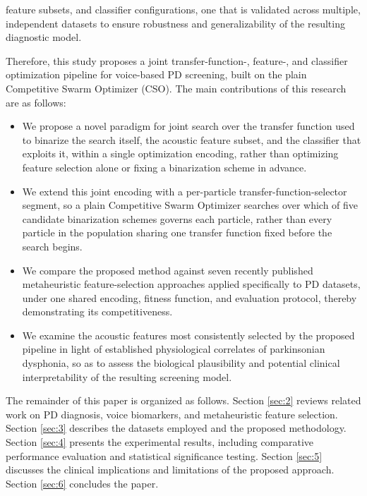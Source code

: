 feature subsets, and classifier configurations, one that is validated across multiple, independent datasets to ensure robustness and generalizability of the resulting diagnostic model.

Therefore, this study proposes a joint transfer-function-, feature-, and classifier optimization pipeline for voice-based PD screening, built on the plain Competitive Swarm Optimizer (CSO). The main contributions of this research are as follows:

\begin{itemize}
    \item We propose a novel paradigm for joint search over the transfer function used to binarize the search itself, the acoustic feature subset, and the classifier that exploits it, within a single optimization encoding, rather than optimizing feature selection alone or fixing a binarization scheme in advance.
    \item We extend this joint encoding with a per-particle transfer-function-selector segment, so a plain Competitive Swarm Optimizer searches over which of five candidate binarization schemes governs each particle, rather than every particle in the population sharing one transfer function fixed before the search begins.
    \item We compare the proposed method against seven recently published metaheuristic feature-selection approaches applied specifically to PD datasets, under one shared encoding, fitness function, and evaluation protocol, thereby demonstrating its competitiveness.
    \item We examine the acoustic features most consistently selected by the proposed pipeline in light of established physiological correlates of parkinsonian dysphonia, so as to assess the biological plausibility and potential clinical interpretability of the resulting screening model.
\end{itemize}

The remainder of this paper is organized as follows. Section \ref{sec:2} reviews related work on PD diagnosis, voice biomarkers, and metaheuristic feature selection. Section \ref{sec:3} describes the datasets employed and the proposed methodology. Section \ref{sec:4} presents the experimental results, including comparative performance evaluation and statistical significance testing. Section \ref{sec:5} discusses the clinical implications and limitations of the proposed approach. Section \ref{sec:6} concludes the paper.
